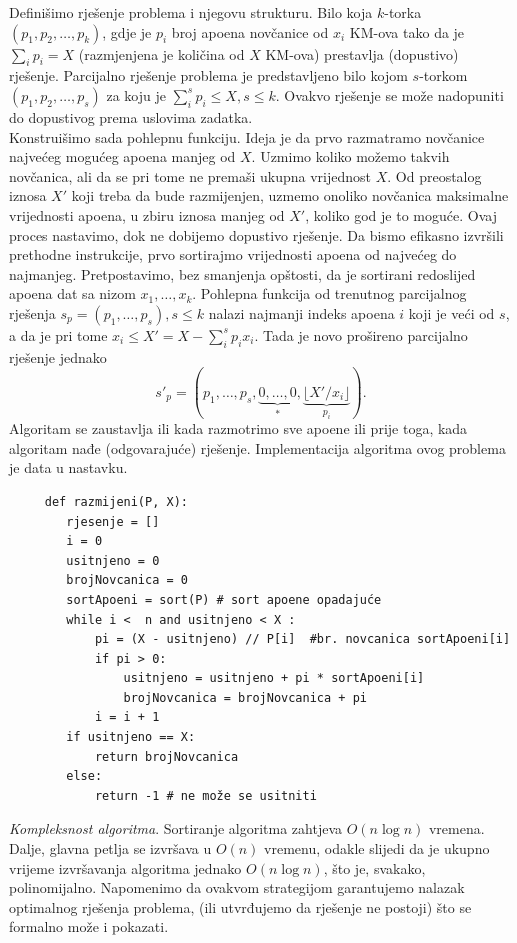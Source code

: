 \begin{solution}
	 Definišimo rješenje problema i njegovu strukturu. Bilo koja $k$-torka $(p_1, p_2, \ldots , p_k )$, gdje je $p_i$ broj
	 apoena novčanice od $x_i$ KM-ova tako da je $\sum_i p_i = X$
	 (razmjenjena je količina od $X$ KM-ova) prestavlja (dopustivo) rješenje. 
	 Parcijalno rješenje problema je predstavljeno bilo kojom $s$-torkom $(p_1, p_2, \ldots , p_s )$ za koju je $\sum_i^s p_i \leq X, s \leq k$.  Ovakvo rješenje se može nadopuniti do dopustivog prema uslovima zadatka. \\ 
	 
	 Konstruišimo sada pohlepnu funkciju. Ideja je da prvo razmatramo novča\-nice najvećeg mogućeg apoena manjeg od $X$. Uzmimo  koliko možemo takvih novčanica, ali da se pri tome ne premaši ukupna vrijednost  $X$. Od preostalog iznosa $X'$ koji treba da bude razmijenjen, uzmemo onoliko novčanica maksimalne vrijednosti apoena, u zbiru iznosa manjeg od $X'$, koliko god je to  moguće. Ovaj proces nastavimo, dok ne dobijemo dopustivo rješenje. Da bismo efikasno izvršili prethodne instrukcije, prvo sortirajmo vrijednosti apoena od najvećeg do najmanjeg. Pretpostavimo, bez smanjenja opštosti, da je  sortirani redoslijed apoena dat sa nizom $x_1, \ldots, x_k$. Pohlepna funkcija od trenutnog parcijalnog rješenja $s_{p}=(p_1, \ldots, p_s), s \leq k$ nalazi najmanji indeks apoena $i$ koji je veći od $s$, a da je pri tome $x_i \leq X'= X - \sum_i^s p_i x_i$. Tada je novo prošireno parcijalno rješenje jednako 
	 $$s'_{p}=(p_1, \ldots, p_s,\underbrace{0,\ldots, 0}_{*}, \underbrace{\lfloor X'/x_i \rfloor}_{p_i} ).$$ 
	 Algoritam se zaustavlja ili kada razmotrimo sve apoene ili prije toga, kada algoritam nađe (odgovarajuće) rješenje. Implementacija algoritma ovog problema  je data u nastavku.
	 \begin{verbatim}
	 def razmijeni(P, X):
	 	rjesenje = []
	 	i = 0
	 	usitnjeno = 0
	 	brojNovcanica = 0
	 	sortApoeni = sort(P) # sort apoene opadajuće
	 	while i <  n and usitnjeno < X :
	 		pi = (X - usitnjeno) // P[i]  #br. novcanica sortApoeni[i]
	 		if pi > 0:
	 			usitnjeno = usitnjeno + pi * sortApoeni[i]
	 			brojNovcanica = brojNovcanica + pi
	 		i = i + 1
	 	if usitnjeno == X:
	 		return brojNovcanica
	 	else:
	 		return -1 # ne može se usitniti
	 \end{verbatim} 
\end{solution}

\textit{Kompleksnost algoritma}. Sortiranje algoritma zahtjeva $O(n \log n)$ vreme\-na. Dalje, glavna petlja se izvršava u $O(n)$ vremenu, odakle slijedi da je ukupno vrijeme izvršavanja algoritma jednako $O(n \log n)$, što je, svakako, polinomi\-jalno.  Napomenimo da ovakvom strategijom garantujemo nalazak optimalnog rje\-šenja problema, (ili utvrđujemo da rješenje ne postoji) što se formalno može i pokazati. 


